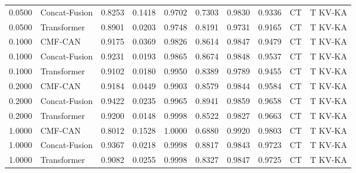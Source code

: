 \begin{tabular}{lllllllll}
0.0500 & Concat-Fusion & 0.8253 & 0.1418 & 0.9702 & 0.7303 & 0.9830 & 0.9336 & CT&T KV-KA \\
0.0500 & Transformer & 0.8901 & 0.0203 & 0.9748 & 0.8191 & 0.9731 & 0.9165 & CT&T KV-KA \\
0.1000 & CMF-CAN & 0.9175 & 0.0369 & 0.9826 & 0.8614 & 0.9847 & 0.9479 & CT&T KV-KA \\
0.1000 & Concat-Fusion & 0.9231 & 0.0193 & 0.9865 & 0.8674 & 0.9848 & 0.9537 & CT&T KV-KA \\
0.1000 & Transformer & 0.9102 & 0.0180 & 0.9950 & 0.8389 & 0.9789 & 0.9455 & CT&T KV-KA \\
0.2000 & CMF-CAN & 0.9184 & 0.0449 & 0.9903 & 0.8579 & 0.9844 & 0.9584 & CT&T KV-KA \\
0.2000 & Concat-Fusion & 0.9422 & 0.0235 & 0.9965 & 0.8941 & 0.9859 & 0.9658 & CT&T KV-KA \\
0.2000 & Transformer & 0.9200 & 0.0148 & 0.9998 & 0.8522 & 0.9827 & 0.9663 & CT&T KV-KA \\
1.0000 & CMF-CAN & 0.8012 & 0.1528 & 1.0000 & 0.6880 & 0.9920 & 0.9803 & CT&T KV-KA \\
1.0000 & Concat-Fusion & 0.9367 & 0.0218 & 0.9998 & 0.8817 & 0.9843 & 0.9723 & CT&T KV-KA \\
1.0000 & Transformer & 0.9082 & 0.0255 & 0.9998 & 0.8327 & 0.9847 & 0.9725 & CT&T KV-KA \\
\bottomrule
\end{tabular}
